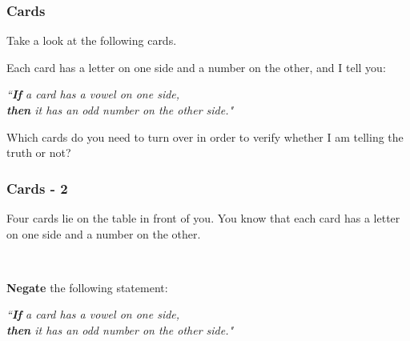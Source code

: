 \documentclass[14pt]{beamer}
\begin{document}

\begin{frame}
\frametitle{Cards}

Take a look at the following cards.

\begin{center}
\end{center}

Each card has a letter on one side and a number on the other, and I tell you:

\medskip
\begin{block}{}
		 \emph{``\textbf{If} a card has a vowel on one side, \\ 
		 \textbf{then} it has an odd number on the other side." }
\end{block}

	
\medskip
Which cards do you need to turn over in order to verify whether I am telling the truth or not?

%
%
%
%
%
%
%
\end{frame}


\begin{frame}
\frametitle{Cards - 2}

Four cards lie on the table in front of you.  You know that each card has a letter on one side and a number on the other.  

\

{\bf Negate} the following statement:
\begin{block}{}
		 \emph{``\textbf{If} a card has a vowel on one side, \\ 
		 \textbf{then} it has an odd number on the other side." }
\end{block}
\end{frame}
\end{document}
